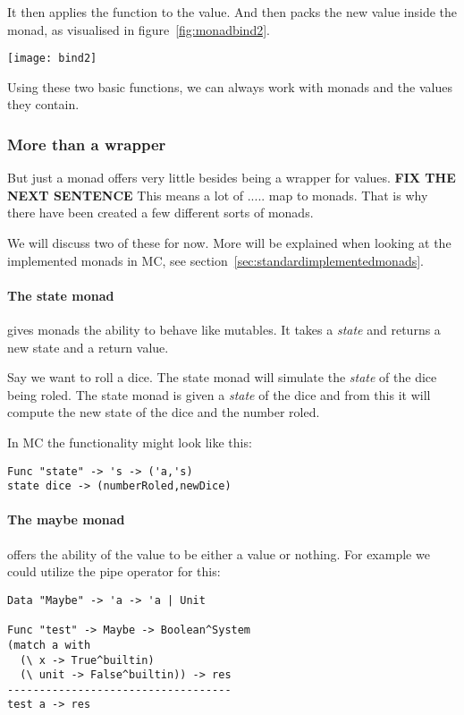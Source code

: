 It then applies the function to the value.
And then packs the new value inside the monad, as visualised in figure~\ref{fig:monadbind2}.

{
   \centering
   \texttt{[image: bind2]}\\
   \label{fig:monadbind2}
   \bigskip
}

Using these two basic functions, we can always work with monads and the values they contain.

\subsubsection{More than a wrapper}
But just a monad offers very little besides being a wrapper for values.
\textbf{FIX THE NEXT SENTENCE}
This means a lot of ..... map to monads.
That is why there have been created a few different sorts of monads.

We will discuss two of these for now.
More will be explained when looking at the implemented monads in MC, see section~\ref{sec:standardimplementedmonads}.

\paragraph{The state monad}
gives monads the ability to behave like mutables.
It takes a \emph{state} and returns a new state and a return value.

Say we want to roll a dice.
The state monad will simulate the \emph{state} of the dice being roled.
The state monad is given a \emph{state} of the dice and from this it will compute the new state of the dice and the number roled.

In MC the functionality might look like this:

\begin{lstlisting}
Func "state" -> 's -> ('a,'s)
state dice -> (numberRoled,newDice)
\end{lstlisting}


\paragraph{The maybe monad}
offers the ability of the value to be either a value or nothing.
For example we could utilize the pipe operator for this:

\begin{lstlisting}
Data "Maybe" -> 'a -> 'a | Unit

Func "test" -> Maybe -> Boolean^System
(match a with
  (\ x -> True^builtin)
  (\ unit -> False^builtin)) -> res
-----------------------------------
test a -> res
\end{lstlisting}

